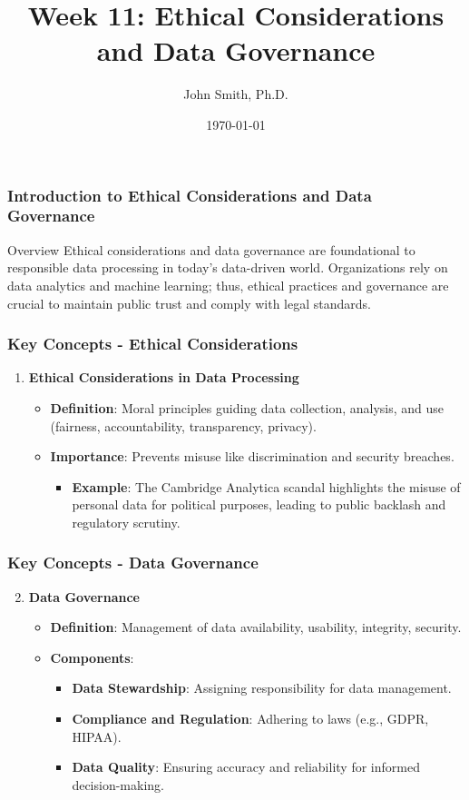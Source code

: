 \documentclass[aspectratio=169]{beamer}
\title{Week 11: Ethical Considerations and Data Governance}
\author[J. Smith]{John Smith, Ph.D.}
\institute[University Name]{
  Department of Computer Science\\
  University Name\\
  \vspace{0.3cm}
  Email: email@university.edu\\
  Website: www.university.edu
}
\date{\today}
\begin{document}
\frame{\titlepage}

\begin{frame}[fragile]
    \frametitle{Introduction to Ethical Considerations and Data Governance}
    \begin{block}{Overview}
        Ethical considerations and data governance are foundational to responsible data processing in today's data-driven world. Organizations rely on data analytics and machine learning; thus, ethical practices and governance are crucial to maintain public trust and comply with legal standards.
    \end{block}
\end{frame}

\begin{frame}[fragile]
    \frametitle{Key Concepts - Ethical Considerations}
    \begin{enumerate}
        \item \textbf{Ethical Considerations in Data Processing}
        \begin{itemize}
            \item \textbf{Definition}: Moral principles guiding data collection, analysis, and use (fairness, accountability, transparency, privacy).
            \item \textbf{Importance}: Prevents misuse like discrimination and security breaches.
            \begin{itemize}
                \item \textbf{Example}: The Cambridge Analytica scandal highlights the misuse of personal data for political purposes, leading to public backlash and regulatory scrutiny.
            \end{itemize}
        \end{itemize}
    \end{enumerate}
\end{frame}

\begin{frame}[fragile]
    \frametitle{Key Concepts - Data Governance}
    \begin{enumerate}
        \setcounter{enumi}{1}
        \item \textbf{Data Governance}
        \begin{itemize}
            \item \textbf{Definition}: Management of data availability, usability, integrity, security.
            \item \textbf{Components}:
            \begin{itemize}
                \item \textbf{Data Stewardship}: Assigning responsibility for data management.
                \item \textbf{Compliance and Regulation}: Adhering to laws (e.g., GDPR, HIPAA).
                \item \textbf{Data Quality}: Ensuring accuracy and reliability for informed decision-making.
            \end{itemize}
        \end{itemize}
    \end{enumerate}
\end{frame}
\end{document}
